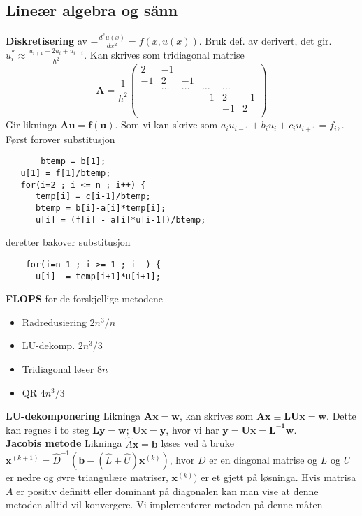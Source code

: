 \documentclass[12pt,a4paper,twocolumn]{article}
\begin{document}
\begin{flushleft}
\subsection{Lineær algebra og sånn} %
\label{sub:linalg}
\textbf{Diskretisering} av $-\frac{d^2u(x)}{dx^2} = f(x,u(x))$. Bruk def. av derivert, det gir. $u^{''}_i \approx  \frac{u_{i+1} -2u_i +u_{i-i}}{h^2}.$ Kan skrives som tridiagonal matrise
\begin{equation*}
\mathbf{A} = \frac{1}{h^2}\left(\begin{array}{cccccc}
                          2 & -1 &  &   &  & \\
                          -1 & 2 & -1 & & & \\
                           & \dots   & \dots &\dots   &\dots & \\
                           &   &  &-1  &2& -1 \\
                           &    &  &   &-1 & 2 \\
                      \end{array} \right)	
\end{equation*}
Gir likninga $\mathbf{A}\mathbf{u} = \mathbf{f}(\mathbf{u}).$ Som vi kan skrive som $a_iu_{i-1}+b_iu_i+c_iu_{i+1} = f_i,$. Først forover substitusjon
\begin{verbatim}
	   btemp = b[1];
   u[1] = f[1]/btemp;
   for(i=2 ; i <= n ; i++) {
      temp[i] = c[i-1]/btemp;
      btemp = b[i]-a[i]*temp[i];
      u[i] = (f[i] - a[i]*u[i-1])/btemp;
\end{verbatim}
deretter bakover substitusjon
\begin{verbatim}
	for(i=n-1 ; i >= 1 ; i--) {
      u[i] -= temp[i+1]*u[i+1];
\end{verbatim}
\textbf{FLOPS} for de forskjellige metodene
\begin{itemize}
	\item Radredusiering $2n^3/n$
	\item LU-dekomp. $2n^3/3$
	\item Tridiagonal løser $8n$ 
	\item QR $4n^3/3$
\end{itemize}
\textbf{LU-dekomponering} Likninga $\mathbf{Ax}=\mathbf{w}$, kan skrives som $\mathbf{A} \mathbf{x} \equiv \mathbf{L} \mathbf{U} \mathbf{x} =\mathbf{w}$. Dette kan regnes i to steg $\mathbf{L} \mathbf{y} = \mathbf{w};\, \mathbf{Ux}=\mathbf{y}$, hvor vi har $\mathbf{y}=\mathbf{Ux}=\mathbf{L^{-1}w}$.\\
\textbf{Jacobis metode} Likninga $\hat{A}\mathbf{x}=\mathbf{b}$ løses ved å bruke $\mathbf{x}^{(k+1)}= \hat{D}^{-1}(\mathbf{b}-(\hat{L}+\hat{U})\mathbf{x}^{(k)})$, hvor $D$ er en diagonal matrise og $L$ og $U$ er nedre og øvre triangulære matriser, $\mathbf{x}^{(k)})$ er et gjett på løsninga. Hvis matrisa $A$ er positiv definitt eller dominant på diagonalen kan man vise at denne metoden alltid vil konvergere. Vi implementerer metoden på denne måten

\end{flushleft}
\end{document}
